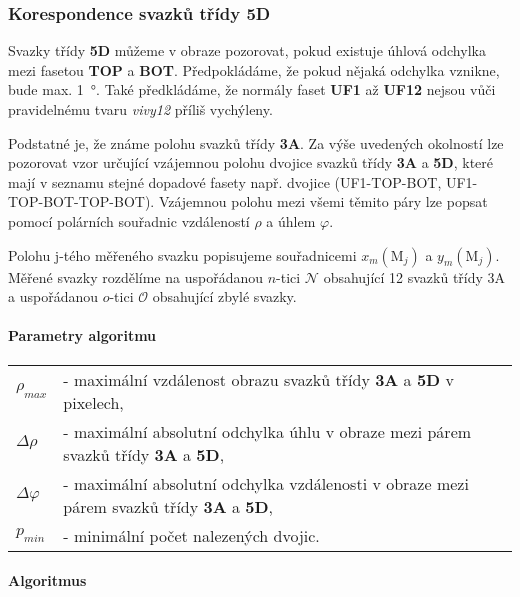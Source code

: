 \newpage
\subsubsection{Korespondence svazků třídy \textbf{5D}}
\label{sec:5D}
	Svazky třídy \textbf{5D} můžeme v obraze pozorovat, pokud existuje úhlová odchylka mezi fasetou \textbf{TOP} a \textbf{BOT}. Předpokládáme, že pokud nějaká odchylka vznikne, bude max. \SI{1}{\degree}. Také předkládáme, že normály faset \textbf{UF1} až \textbf{UF12} nejsou vůči pravidelnému tvaru \textit{vivy12} příliš vychýleny.
	
	Podstatné je, že známe polohu svazků třídy \textbf{3A}. Za výše uvedených okolností lze pozorovat vzor určující vzájemnou polohu dvojice svazků třídy \textbf{3A} a \textbf{5D}, které mají v seznamu stejné dopadové fasety např. dvojice (UF1-TOP-BOT, UF1-TOP-BOT-TOP-BOT). Vzájemnou polohu mezi všemi těmito páry lze popsat pomocí polárních souřadnic vzdáleností $\rho$ a úhlem $\varphi$. 
	
	Polohu j-tého měřeného svazku popisujeme souřadnicemi $x_m(\mathrm{M}_j)$ a $y_m(\mathrm{M}_j)$. Měřené svazky rozdělíme na uspořádanou $n$-tici $\mathcal{N}$ obsahující 12 svazků třídy 3A a uspořádanou $o$-tici $\mathcal{O}$ obsahující zbylé svazky. 

\paragraph{Parametry algoritmu}
\hspace{1mm}

	 \begin{tabular}{l l}
	 $\rho_{max}$ & - maximální vzdálenost obrazu svazků třídy \textbf{3A} a \textbf{5D} v pixelech,\\
	 $\Delta\rho$ & - maximální absolutní odchylka úhlu v obraze mezi párem svazků třídy \textbf{3A} a \textbf{5D},\\
	 $\Delta\varphi$ & - maximální absolutní odchylka vzdálenosti v obraze mezi párem svazků třídy \textbf{3A} a \textbf{5D},\\
	 $p_{min}$ & - minimální počet nalezených dvojic.\\
	 \end{tabular}

\paragraph{Algoritmus}

